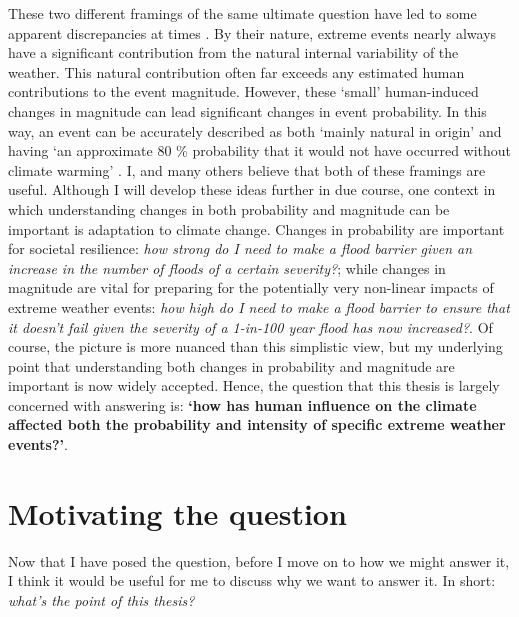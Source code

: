   These two different framings of the same ultimate question have led to some apparent discrepancies at times \citep{otto_reconciling_2012}. By their nature, extreme events nearly always have a significant contribution from the natural internal variability of the weather. This natural contribution often far exceeds any estimated human contributions to the event magnitude. However, these `small' human-induced changes in magnitude can lead significant changes in event probability. In this way, an event can be accurately described as both `mainly natural in origin' \citep{dole_was_2011} and having `an approximate 80 \% probability that it would not have occurred without climate warming' \citep{rahmstorf_increase_2011}. I, and many others \citep{stott_attribution_2013,stott_attribution_2016,otto_attribution_2016,swain_attributing_2020,easterling_detection_2016,national_academies_of_sciences_engineering_and_medicine_attribution_2016} believe that both of these framings are useful. Although I will develop these ideas further in due course, one context in which understanding changes in both probability and magnitude can be important is adaptation to climate change. Changes in probability are important for societal resilience: \emph{how strong do I need to make a flood barrier given an increase in the number of floods of a certain severity?}; while changes in magnitude are vital for preparing for the potentially very non-linear impacts of extreme weather events: \emph{how high do I need to make a flood barrier to ensure that it doesn't fail given the severity of a 1-in-100 year flood has now increased?}. Of course, the picture is more nuanced than this simplistic view, but my underlying point that understanding both changes in probability and magnitude are important is now widely accepted. Hence, the question that this thesis is largely concerned with answering is: \textbf{`how has human influence on the climate affected both the probability and intensity of specific extreme weather events?'}.


\section{Motivating the question}

  Now that I have posed the question, before I move on to how we might answer it, I think it would be useful for me to discuss why we want to answer it. In short: \emph{what's the point of this thesis?}

